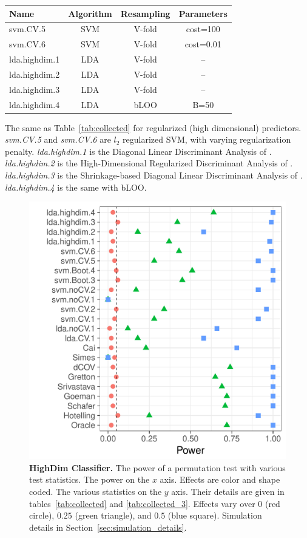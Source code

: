 \documentclass[journal]{IEEEtran}
\begin{document}
\begin{tcolorbox}
	\centering
	\tiny
	\begin{tabular}{l|c|c|c}
		Name & Algorithm & Resampling &  Parameters\\ 
		\hline
		\hline
		svm.CV.5 & SVM & V-fold & cost=100 \\ 
		svm.CV.6 & SVM & V-fold & cost=0.01\\ 
		lda.highdim.1 & LDA & V-fold & -- \\ 
		lda.highdim.2 & LDA & V-fold & -- \\ 
		lda.highdim.3 & LDA & V-fold & -- \\ 
		lda.highdim.4 & LDA & bLOO 	 & B=50 \\ 
	\end{tabular} 
	\captionsetup{type=table}
	\caption{\footnotesize
		The same as Table~\ref{tab:collected} for regularized (high dimensional) predictors. 
		\emph{svm.CV.5} and \emph{svm.CV.6} are $l_2$ regularized SVM, with varying regularization penalty.
		\emph{lda.highdim.1} is the Diagonal Linear Discriminant Analysis of \cite{dudoit_comparison_2002}.
		\emph{lda.highdim.2} is the High-Dimensional Regularized Discriminant Analysis of \cite{ramey_high-dimensional_2016}.
		\emph{lda.highdim.3} is the Shrinkage-based Diagonal Linear Discriminant Analysis of \cite{pang_shrinkage-based_2009}.
		\emph{lda.highdim.4} is the same with bLOO.
	} 
	\label{tab:collected_3}
\end{tcolorbox}


\begin{figure}[ht]
	\centering
	\includegraphics[width=0.5\columnwidth]{"art/file14"}
	\caption{
		\textbf{HighDim Classifier.} 
		The power of a permutation test with various test statistics. 
		The power on the $x$ axis. 
		Effects are color and shape coded. 
		The various statistics on the $y$ axis. 
		Their details are given in tables~\ref{tab:collected} and \ref{tab:collected_3}. 
		Effects vary over $0$ (red circle), $0.25$ (green triangle), and $0.5$ (blue square). 
		Simulation details in Section~\ref{sec:simulation_details}.
	} 
	\label{fig:highdim}
\end{figure}
\end{document}
